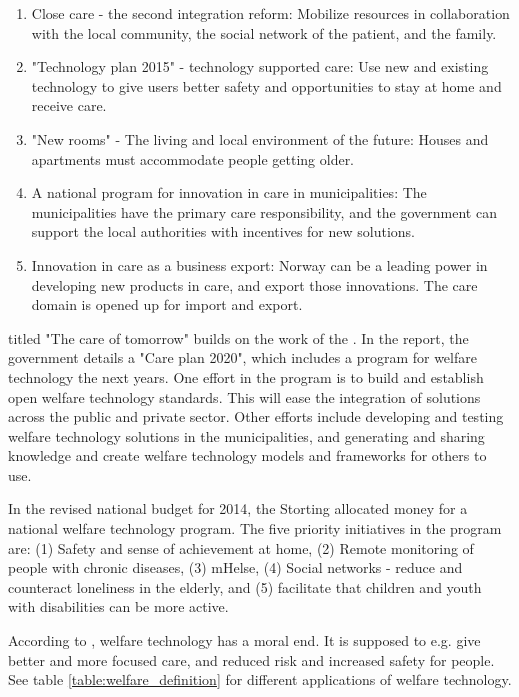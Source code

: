 \begin{enumerate}
    \item Close care - the second integration reform: Mobilize resources in collaboration with
    the local community, the social network of the patient, and the family.
    \item "Technology plan 2015" -  technology supported care: Use new and existing technology to give users
    better safety and opportunities to stay at home and receive care.
    \item "New rooms" - The living and local environment of the future: Houses and apartments must accommodate
    people getting older.
    \item A national program for innovation in care in municipalities: The municipalities have the primary care
    responsibility, and the government can support the local authorities with incentives for new solutions.
    \item Innovation in care as a business export: Norway can be a leading power in developing new products in care, and
    export those innovations. The care domain is opened up for import and export.
\end{enumerate}

\citet{morgendagens_omsorg} titled "The care of tomorrow" builds on the work of the \citet{regjeringen_hagen}
.
In the report, the government details a "Care plan 2020", which includes a program for welfare technology the next years.
One effort in the program is to build and establish open welfare technology standards. This will ease the integration of solutions
across the public and private sector. Other efforts include developing and testing welfare technology solutions in the municipalities,
and generating and sharing knowledge and create welfare technology models and frameworks for others to use.

In the revised national budget for 2014, the Storting allocated money for a national welfare technology program. The
five priority initiatives in the program are: (1) Safety and sense of achievement at home, (2) Remote monitoring of
people with chronic diseases, (3) mHelse, (4) Social networks - reduce and counteract loneliness in the elderly, and (5)
facilitate that children and youth with disabilities can be more active.

According to \citet{welfare_ethical}, welfare technology has a moral end. It is supposed to
e.g. give better and more focused care, and reduced risk and increased safety for people. See table
\ref{table:welfare_definition} for different applications of welfare technology. 

